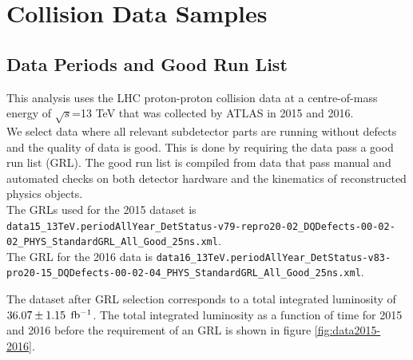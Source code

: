 \chapter{Collision Data Samples}
\label{chap:data}
\section{Data Periods and Good Run List}
\label{EventSel:GRL}

\indent This analysis uses the LHC proton-proton collision data at a centre-of-mass energy of $\sqrt{s}$=13 TeV that was collected by ATLAS in 2015 and 2016. \\

\indent We select data where all relevant subdetector parts are running without defects and the quality of data is good.  This is done by requiring the data pass a good run list (GRL).  The good run list is compiled from data that pass manual and automated checks on both detector hardware and the kinematics of reconstructed physics objects.  \\

\indent The GRLs used for the 2015 dataset is {\tt \scriptsize data15\_13TeV.periodAllYear\_DetStatus-v79-repro20-02\_DQDefects-00-02-02\_PHYS\_StandardGRL\_All\_Good\_25ns.xml}.  \\
\indent The GRL for the 2016 data is {\tt \scriptsize data16\_13TeV.periodAllYear\_DetStatus-v83-pro20-15\_DQDefects-00-02-04\_PHYS\_StandardGRL\_All\_Good\_25ns.xml}.

\indent The dataset after GRL selection corresponds to a total integrated luminosity of $36.07 \pm 1.15$ $\mbox{fb$^{-1}$}$.  The total integrated luminosity as a function of time for 2015 and 2016 before the requirement of an GRL is shown in figure \ref{fig:data2015-2016}.\\

